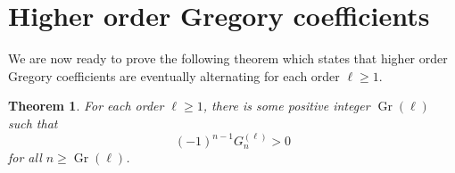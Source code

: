 \documentclass[11pt]{article}
\DeclareMathOperator{\Gr}{Gr}
\theoremstyle{plain}
\newtheorem{thm}{Theorem}[section]
\theoremstyle{definition}
\begin{document}
\section{Higher order Gregory coefficients}\label{sec:GregoryGeneralOrder}

We are now ready to prove the following theorem which states that higher order Gregory coefficients are eventually alternating for each order $\ell\ge 1$.

\begin{thm}\label{thm:GregoryGeneralOrder}
For each order $\ell\ge 1$, there is some positive integer $\Gr(\ell)$ such that
\begin{equation*}
(-1)^{n-1} G_n^{(\ell)}>0
\end{equation*}
for all $n\ge \Gr(\ell)$.
\end{thm}
\end{document}
